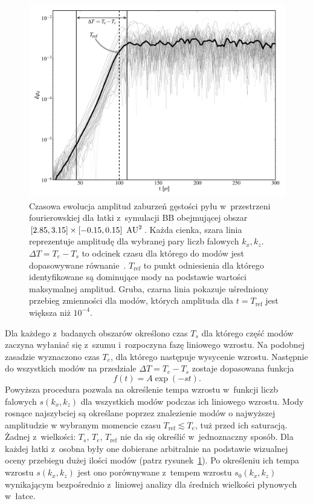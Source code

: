 \begin{figure}
  \includegraphics[width=0.98\linewidth]{figures/fig7}

  \caption{Czasowa ewolucja amplitud zaburzeń gęstości pyłu w~przestrzeni
     fourierowskiej dla łatki z~symulacji BB obejmującej obszar 
     $[2.85,3.15]\times[-0.15,0.15]~\hbox{$\thinspace\textrm{AU}$}^2$. Każda cienka, szara linia
     reprezentuje amplitudę dla wybranej pary liczb falowych $k_x, k_z$.
     $\Delta T = T_e - T_s$ to odcinek czasu dla którego do modów jest
     dopasowywane równanie~. $T_{\textrm{ref}}$ to punkt
     odniesienia dla którego identyfikowane są dominujące mody na podstawie
     wartości maksymalnej amplitud. Gruba, czarna linia pokazuje uśredniony
     przebieg zmienności dla modów, których amplituda dla $t = T_{\textrm{ref}}$
     jest większa niż $10^{-4}$.} 
   \label{fig7} 
\end{figure}

Dla każdego z~badanych obszarów określono czas $T_s$ dla którego część modów
zaczyna wyłaniać się z~szumu i~rozpoczyna fazę liniowego wzrostu. Na
podobnej zasadzie wyznaczono czas $T_e$, dla którego następuje wysycenie
wzrostu. Następnie do wszystkich modów na przedziale $\Delta T = T_e - T_s$
zostaje dopasowana funkcja
%
\begin{equation}
   f(t) = A\exp\left(-s t\right).
   \label{eq:fit}
\end{equation}
%
Powyższa procedura pozwala na określenie tempa wzrostu w~funkcji liczb falowych
$s(k_x, k_z)$ dla wszystkich modów podczas ich liniowego wzrostu. Mody rosnące
najszybciej są określane poprzez znalezienie modów o najwyższej amplitudzie w
wybranym momencie czasu $T_{\textrm{ref}} \lesssim T_e$, tuż przed ich
saturacją. Żadnej z~wielkości: $T_s$, $T_e$, $T_{\textrm{ref}}$ nie da się
określić w~jednoznaczny sposób. Dla każdej łatki z~osobna były one dobierane
arbitralnie na podstawie wizualnej oceny przebiegu dużej ilości modów (patrz
rysunek~\ref{fig7}).  Po określeniu ich tempa wzrostu $s(k_x, k_z)$ jest ono
porównywane z~tempem wzrostu $s_0(k_x, k_z)$ wynikającym bezpośrednio z~liniowej
analizy dla średnich wielkości płynowych w~łatce.


